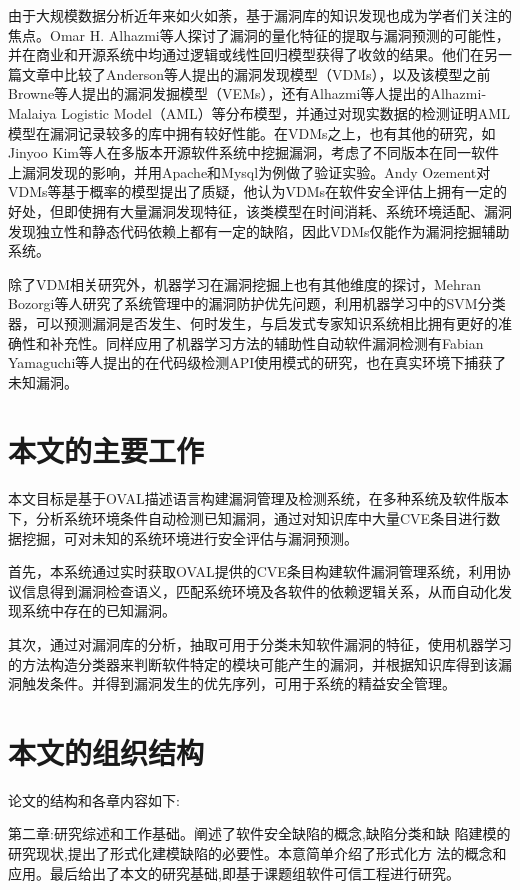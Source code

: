 \documentclass[a4paper]{ctexrep}
\begin{document}
		由于大规模数据分析近年来如火如荼，基于漏洞库的知识发现也成为学者们关注的焦点。Omar H. Alhazmi等人探讨了漏洞的量化特征的提取与漏洞预测的可能性，并在商业和开源系统中均通过逻辑或线性回归模型获得了收敛的结果。他们在另一篇文章中比较了Anderson等人提出的漏洞发现模型（VDMs），以及该模型之前Browne等人提出的漏洞发掘模型（VEMs），还有Alhazmi等人提出的Alhazmi-Malaiya Logistic Model（AML）等分布模型，并通过对现实数据的检测证明AML模型在漏洞记录较多的库中拥有较好性能。在VDMs之上，也有其他的研究，如Jinyoo Kim等人在多版本开源软件系统中挖掘漏洞，考虑了不同版本在同一软件上漏洞发现的影响，并用Apache和Mysql为例做了验证实验。Andy Ozement对VDMs等基于概率的模型提出了质疑，他认为VDMs在软件安全评估上拥有一定的好处，但即使拥有大量漏洞发现特征，该类模型在时间消耗、系统环境适配、漏洞发现独立性和静态代码依赖上都有一定的缺陷，因此VDMs仅能作为漏洞挖掘辅助系统。
		
		除了VDM相关研究外，机器学习在漏洞挖掘上也有其他维度的探讨，Mehran Bozorgi等人研究了系统管理中的漏洞防护优先问题，利用机器学习中的SVM分类器，可以预测漏洞是否发生、何时发生，与启发式专家知识系统相比拥有更好的准确性和补充性。同样应用了机器学习方法的辅助性自动软件漏洞检测有Fabian Yamaguchi等人提出的在代码级检测API使用模式的研究，也在真实环境下捕获了未知漏洞。
		\section{本文的主要工作}
		本文目标是基于OVAL描述语言构建漏洞管理及检测系统，在多种系统及软件版本下，分析系统环境条件自动检测已知漏洞，通过对知识库中大量CVE条目进行数据挖掘，可对未知的系统环境进行安全评估与漏洞预测。

		首先，本系统通过实时获取OVAL提供的CVE条目构建软件漏洞管理系统，利用协议信息得到漏洞检查语义，匹配系统环境及各软件的依赖逻辑关系，从而自动化发现系统中存在的已知漏洞。
		
		其次，通过对漏洞库的分析，抽取可用于分类未知软件漏洞的特征，使用机器学习的方法构造分类器来判断软件特定的模块可能产生的漏洞，并根据知识库得到该漏洞触发条件。并得到漏洞发生的优先序列，可用于系统的精益安全管理。
		\section{本文的组织结构}
		论文的结构和各章内容如下:
		
		第二章:研究综述和工作基础。阐述了软件安全缺陷的概念,缺陷分类和缺 陷建模的研究现状,提出了形式化建模缺陷的必要性。本意简单介绍了形式化方 法的概念和应用。最后给出了本文的研究基础,即基于课题组软件可信工程进行研究。 
		
\end{document}
